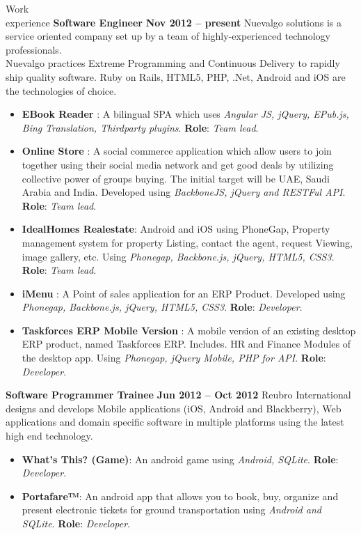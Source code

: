 \documentclass{resume}
\begin{document}
\begin{category}{Work \\experience}
  \citemnobullet \textbf{Software Engineer} \hfill \textbf{Nov 2012 -- present}
  \citemnobullet Nuevalgo solutions is a service oriented company set up by a team of highly-experienced technology professionals. \\Nuevalgo practices Extreme Programming and Continuous
  Delivery to rapidly ship quality software. Ruby on Rails, HTML5, PHP, .Net, Android and iOS are the technologies of choice.
  \begin{itemize}
  \item \textbf{EBook Reader} : A bilingual SPA which uses {\em Angular JS, jQuery, EPub.js, Bing Translation, Thirdparty plugins}. \textbf{Role}: {\em Team lead}. 
  \item \textbf{Online Store} : A social commerce application which allow users to join together using their social media network and get good deals by utilizing collective power of groups buying. The initial target will be UAE, Saudi Arabia and India. Developed using {\em BackboneJS, jQuery and RESTFul API}. \textbf{Role}: {\em Team lead}.
  \item \textbf{IdealHomes Realestate}: Android and iOS using PhoneGap, Property management system for property Listing, contact the agent, request Viewing, image gallery, etc. Using {\em Phonegap, Backbone.js, jQuery, HTML5, CSS3}. \textbf{Role}: {\em Team lead}.
  \item \textbf{iMenu} : A Point of sales application for an ERP Product. Developed using {\em Phonegap, Backbone.js, jQuery, HTML5, CSS3}. \textbf{Role}: {\em Developer}.
  \item \textbf{Taskforces ERP Mobile Version} : A mobile version of an existing desktop ERP product, named Taskforces ERP. Includes. HR and Finance Modules of the desktop app. Using{\em
      Phonegap, jQuery Mobile, PHP for API}. \textbf{Role}: {\em Developer}. 
  \end{itemize}
  \citemnobullet \textbf{Software Programmer Trainee} \hfill \textbf{Jun 2012 -- Oct 2012}
  \citemnobullet Reubro International designs and develops Mobile applications (iOS, Android and Blackberry), Web applications and domain specific software in multiple platforms using the latest high end technology.
  \begin{itemize} 
  \item \textbf{What’s This? (Game)}: An android game using {\em Android, SQLite}. \textbf{Role}: {\em Developer}.
  \item \textbf{Portafare™}:  An android app that allows you to book, buy, organize and present electronic tickets for ground transportation using {\em Android and SQLite}. \textbf{Role}: {\em Developer}.
  \end{itemize}
\end{category}
\end{document}

